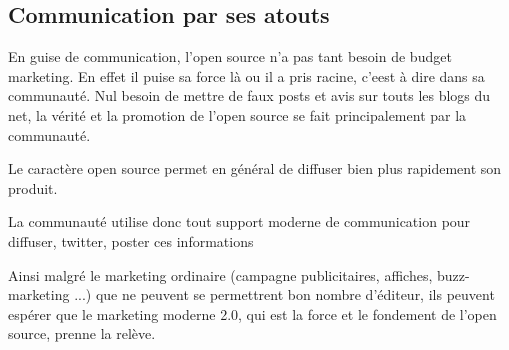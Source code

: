 		\subsection{Communication par ses atouts}

			En guise de communication, l'open source n'a pas tant besoin de budget marketing. En effet il puise sa force là ou il a pris racine, c'eest à dire dans sa communauté. Nul besoin de mettre de faux posts et avis sur touts les blogs du net, la vérité et la promotion de l'open source se fait principalement par la communauté.

			Le caractère open source permet en général de diffuser bien plus rapidement son produit.

			La communauté utilise donc tout support moderne de communication pour diffuser, twitter, poster ces informations

			Ainsi malgré le marketing ordinaire (campagne publicitaires, affiches, buzz-marketing ...) que ne peuvent se permettrent bon nombre d'éditeur, ils peuvent espérer que le marketing moderne 2.0, qui est la force et le fondement de l'open source, prenne la relève.











